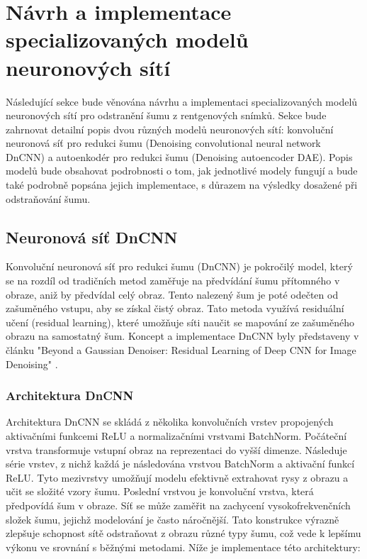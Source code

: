 \documentclass[male,czech,api_ing]{thesis}
\begin{document}
\section{Návrh a implementace specializovaných modelů neuronových sítí}
Následující sekce bude věnována návrhu a implementaci specializovaných modelů neuronových sítí pro odstranění šumu z rentgenových snímků. Sekce bude zahrnovat detailní popis dvou různých modelů neuronových sítí: konvoluční neuronová síť pro redukci šumu (Denoising convolutional neural network DnCNN) a autoenkodér pro redukci šumu (Denoising autoencoder DAE). Popis modelů bude obsahovat podrobnosti o tom, jak jednotlivé modely fungují a bude také podrobně popsána jejich implementace, s důrazem na výsledky dosažené při odstraňování šumu.

\subsection{Neuronová síť DnCNN}
Konvoluční neuronová síť pro redukci šumu (DnCNN) je pokročilý model, který se na rozdíl od tradičních metod zaměřuje na předvídání šumu přítomného v obraze, aniž by předvídal celý obraz. Tento nalezený šum je poté odečten od zašuměného vstupu, aby se získal čistý obraz. Tato metoda využívá residuální učení (residual learning), které umožňuje síti naučit se mapování ze zašuměného obrazu na samostatný šum. Koncept a implementace DnCNN byly představeny v článku "Beyond a Gaussian Denoiser: Residual Learning of Deep CNN for Image Denoising" \cite{DnCNN}.

\subsubsection{Architektura DnCNN}
Architektura DnCNN se skládá z několika konvolučních vrstev propojených aktivačními funkcemi ReLU a normalizačními vrstvami BatchNorm. Počáteční vrstva transformuje vstupní obraz na reprezentaci do vyšší dimenze. Následuje série vrstev, z nichž každá je následována vrstvou BatchNorm a aktivační funkcí ReLU. Tyto mezivrstvy umožňují modelu efektivně extrahovat rysy z obrazu a učit se složité vzory šumu. Poslední vrstvou je konvoluční vrstva, která předpovídá šum v obraze. Síť se může zaměřit na zachycení vysokofrekvenčních složek šumu, jejichž modelování je často náročnější. Tato konstrukce výrazně zlepšuje schopnost sítě odstraňovat z obrazu různé typy šumu, což vede k lepšímu výkonu ve srovnání s běžnými metodami. Níže je implementace této architektury:
\end{document}

